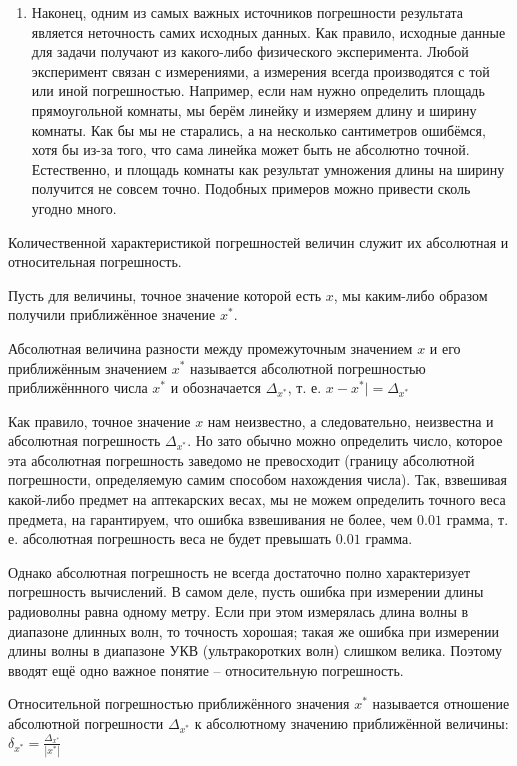\begin{enumerate}
	\item Наконец, одним из самых важных источников погрешности результата
		является неточность самих исходных данных. Как правило,
		исходные данные для задачи получают из какого-либо физического
		эксперимента. Любой эксперимент связан с измерениями, а
		измерения всегда производятся с той или иной погрешностью.
		Например, если нам нужно определить площадь прямоугольной
		комнаты, мы берём линейку и измеряем длину и ширину комнаты.
		Как бы мы не старались, а на несколько сантиметров ошибёмся,
		хотя бы из-за того, что сама линейка может быть не абсолютно
		точной. Естественно, и площадь комнаты как результат умножения
		длины на ширину получится не совсем точно. Подобных примеров
		можно привести сколь угодно много.
\end{enumerate}

Количественной характеристикой погрешностей величин служит их абсолютная и
относительная погрешность.

Пусть для величины, точное значение которой есть $x$, мы каким-либо образом
получили приближённое значение $x^*$.

\begin{definition}
	Абсолютная величина разности между промежуточным значением $x$ и его
	приближённым значением $x^*$ называется абсолютной погрешностью
	приближённного числа $x^*$ и обозначается $\Delta_{x^*}$, т. е. $x - x^*| =
	\Delta_{x^*}$
\end{definition}

Как правило, точное значение $x$ нам неизвестно, а следовательно, неизвестна и
абсолютная погрешность $\Delta_{x^*}$. Но зато обычно можно определить число,
которое эта абсолютная погрешность заведомо не превосходит (границу абсолютной
погрешности, определяемую самим способом нахождения числа). Так, взвешивая
какой-либо предмет на аптекарских весах, мы не можем определить точного веса
предмета, на гарантируем, что ошибка взвешивания не более, чем $0.01$ грамма,
т. е. абсолютная погрешность веса не будет превышать $0.01$ грамма.

Однако абсолютная погрешность не всегда достаточно полно характеризует
погрешность вычислений. В самом деле, пусть ошибка при измерении длины
радиоволны равна одному метру. Если при этом измерялась длина волны в диапазоне
длинных волн, то точность хорошая; такая же ошибка при измерении длины волны в
диапазоне УКВ (ультракоротких волн) слишком велика. Поэтому вводят ещё одно
важное понятие -- относительную погрешность.

\begin{definition}
	Относительной погрешностью приближённого значения $x^*$ называется
	отношение абсолютной погрешности $\Delta_{x^*}$ к абсолютному значению
	приближённой величины: $\delta_{x^*} = \frac{\Delta_{x^*}}{|x^*|}$
\end{definition}

